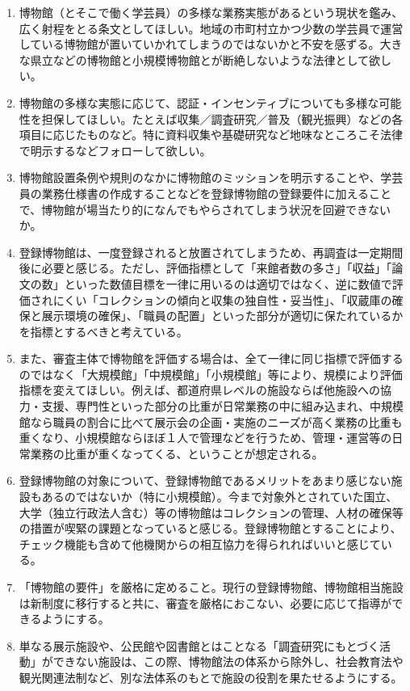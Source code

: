 \documentclass[12pt]{jsarticle}
\begin{document}
\begin{enumerate}
	\item 博物館（とそこで働く学芸員）の多様な業務実態があるという現状を鑑み、広く射程をとる条文としてほしい。地域の市町村立かつ少数の学芸員で運営している博物館が置いていかれてしまうのではないかと不安を感ずる。大きな県立などの博物館と小規模博物館とが断絶しないような法律として欲しい。
	\item 博物館の多様な実態に応じて、認証・インセンティブについても多様な可能性を担保してほしい。たとえば収集／調査研究／普及（観光振興）などの各項目に応じたものなど。特に資料収集や基礎研究など地味なところこそ法律で明示するなどフォローして欲しい。
	\item 博物館設置条例や規則のなかに博物館のミッションを明示することや、学芸員の業務仕様書の作成することなどを登録博物館の登録要件に加えることで、博物館が場当たり的になんでもやらされてしまう状況を回避できないか。
	\item 登録博物館は、一度登録されると放置されてしまうため、再調査は一定期間後に必要と感じる。ただし、評価指標として「来館者数の多さ」「収益」「論文の数」といった数値目標を一律に用いるのは適切ではなく、逆に数値で評価されにくい「コレクションの傾向と収集の独自性・妥当性」、「収蔵庫の確保と展示環境の確保」、「職員の配置」といった部分が適切に保たれているかを指標とするべきと考えている。
	\item また、審査主体で博物館を評価する場合は、全て一律に同じ指標で評価するのではなく「大規模館」「中規模館」「小規模館」等により、規模により評価指標を変えてほしい。例えば、都道府県レベルの施設ならば他施設への協力・支援、専門性といった部分の比重が日常業務の中に組み込まれ、中規模館なら職員の割合に比べて展示会の企画・実施のニーズが高く業務の比重も重くなり、小規模館ならほぼ１人で管理などを行うため、管理・運営等の日常業務の比重が重くなってくる、ということが想定される。
	\item 登録博物館の対象について、登録博物館であるメリットをあまり感じない施設もあるのではないか（特に小規模館）。今まで対象外とされていた国立、大学（独立行政法人含む）等の博物館はコレクションの管理、人材の確保等の措置が喫緊の課題となっていると感じる。登録博物館とすることにより、チェック機能も含めて他機関からの相互協力を得られればいいと感じている。
	\item 「博物館の要件」を厳格に定めること。現行の登録博物館、博物館相当施設は新制度に移行すると共に、審査を厳格におこない、必要に応じて指導ができるようにする。
	\item 単なる展示施設や、公民館や図書館とはことなる「調査研究にもとづく活動」ができない施設は、この際、博物館法の体系から除外し、社会教育法や観光関連法制など、別な法体系のもとで施設の役割を果たせるようにする。

\end{enumerate}
\end{document}
